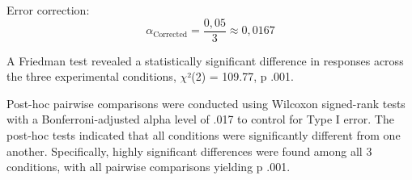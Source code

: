 \begin{itemize}
{Error correction:
\begin{equation}
	\alpha_{\text{Corrected}} = \frac{0{,}05}{3} \approx 0{,}0167 
\end{equation}

A Friedman test revealed a statistically significant difference in responses across the three experimental conditions, $\chi$²(2) = 109.77, p \lt .001.

Post-hoc pairwise comparisons were conducted using Wilcoxon signed-rank tests with a Bonferroni-adjusted alpha level of .017 to control for Type I error. The post-hoc tests indicated that all conditions were significantly different from one another. Specifically, highly significant differences were found among all 3 conditions, with all pairwise comparisons yielding p \lt .001.
}
\end{itemize}

